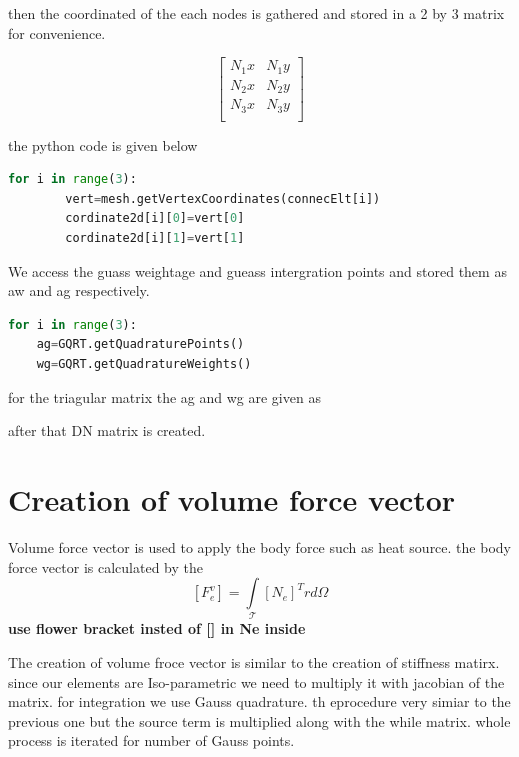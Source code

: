 \documentclass{article}
\begin{document}
then the coordinated of the each nodes is gathered and stored in a 2 by 3 matrix for convenience. 

\[  
\begin{bmatrix}

N_1x & N_1y \\
N_2x & N_2y \\
N_3x & N_3y \\

\end{bmatrix}
\]

the python code is given below


\begin{lstlisting}[language=Python]
 for i in range(3):
        vert=mesh.getVertexCoordinates(connecElt[i])
        cordinate2d[i][0]=vert[0]
        cordinate2d[i][1]=vert[1]
\end{lstlisting} 

We access the guass weightage and gueass intergration points and stored them as aw and ag respectively.  

\begin{lstlisting}[language=Python]
 for i in range(3):
    ag=GQRT.getQuadraturePoints()
    wg=GQRT.getQuadratureWeights()
\end{lstlisting} 

for the triagular matrix the ag and wg are given as

after that DN matrix is created. 







\section{Creation of volume force vector}

Volume force vector is used to apply the body force such as heat source. the body force vector is calculated by the 
\[ [F^v_e] = \int \limits_\mathcal{T} [N_e]^T r  d \Omega \]
\textbf{use flower bracket insted of [] in Ne inside}

The creation of volume froce vector is similar to the creation of stiffness matirx. since our elements are Iso-parametric we need to multiply it with jacobian of the matrix. for integration we use Gauss quadrature. th eprocedure very simiar to the previous one but the source term is multiplied along with the while matrix. whole process is iterated for number of Gauss points. 

%
\end{document}
